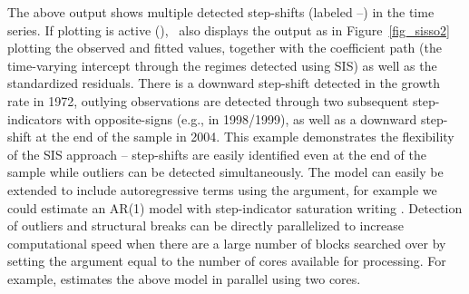 \documentclass[article,nojss]{jss}
\begin{document}
%
The above output shows multiple detected step-shifts (labeled
--) in the time series. If plotting is
active (), \ also displays the output as
in Figure~\ref{fig_sisso2} plotting the observed and fitted values,
together with the coefficient path (the time-varying intercept through
the regimes detected using SIS) as well as the standardized
residuals. There is a downward step-shift detected in the growth rate
in 1972, outlying observations are detected through two subsequent
step-indicators with opposite-signs (e.g., in 1998/1999), as well as a
downward step-shift at the end of the sample in 2004. This example
demonstrates the flexibility of the SIS approach -- step-shifts are
easily identified even at the end of the sample while outliers can be
detected simultaneously. The model can easily be extended to include
autoregressive terms using the  argument, for example we
could estimate an AR(1) model with step-indicator saturation writing
. Detection of outliers and 
structural breaks can be directly parallelized to increase 
computational speed when there are a large number of blocks searched 
over by setting the argument  equal to the 
number of cores available for processing. For example, 
 estimates the 
above model in parallel using two cores.  
\end{document}

